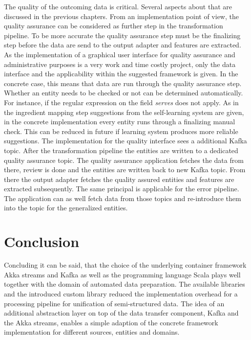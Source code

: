 The quality of the outcoming data is critical. Several aspects about that are discussed in the previous chapters. From an implementation point of view, the quality assurance can be considered as further step in the transformation pipeline. To be more accurate the quality assurance step must be the finalizing step before the data are send to the output adapter and features are extracted.
As the implementation of a graphical user interface for quality assurance and administrative purposes is a very work and time costly project, only the data interface and the applicability within the suggested framework is given. 
In the concrete case, this means that data are run through the quality assurance step. Whether an entity needs to be checked or not can be determined automatically. For instance, if the regular expression on the field \textit{serves} does not apply. As in the ingredient mapping step suggestions from the self-learning system are given, in the concrete implementation every entity runs through a finalizing manual check. This can be reduced in future if learning system produces more reliable suggestions. 
The implementation for the quality interface sees a additional Kafka topic. After the transformation pipeline the entities are written to a dedicated quality assurance topic. The quality assurance application fetches the data from there, review is done and the entities are written back to new Kafka topic. From there the output adapter fetches the quality assured entities and features are extracted subsequently. The same principal is applicable for the error pipeline. The application can as well fetch data from those topics and re-introduce them into the topic for the generalized entities.

\section{Conclusion}

Concluding it can be said, that the choice of the underlying container framework Akka streams and Kafka as well as the programming language Scala plays well together with the domain of automated data preparation. The available libraries and the introduced custom library reduced the implementation overhead for a processing pipeline for unification of semi-structured data. The idea of an additional abstraction layer on top of the data transfer component, Kafka and the Akka streams, enables a simple adaption of the concrete framework implementation for different sources, entities and domains.
